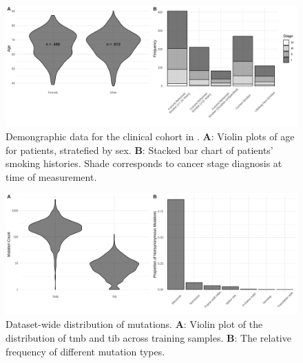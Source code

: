 \documentclass[12pt]{article}
\begin{document}
\begin{figure}[htbp]
\centering
\includegraphics[width=6in]{fig1.png}
\vspace*{-5mm}
\caption{Demongraphic data for the clinical cohort in \citet{campbell_distinct_2016}. \textbf{A}: Violin plots of age for patients, stratefied by sex. \textbf{B}: Stacked bar chart of patients' smoking histories. Shade corresponds to cancer stage diagnosis at time of measurement. \label{fig:1}}
\vspace*{-2mm}
\end{figure}

\begin{figure}[htbp]
\centering
\includegraphics[width=6in]{fig2.png}
\vspace*{-5mm}
\caption{ Dataset-wide distribution of mutations. \textbf{A}: Violin plot of the distribution of \acrshort{tmb} and \acrshort{tib} across training samples. \textbf{B}: The relative frequency of different mutation types. \label{fig:2}}
\vspace*{-2mm}
\end{figure}
\end{document}
